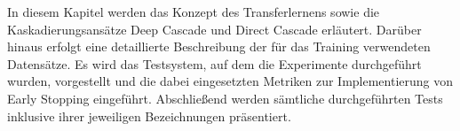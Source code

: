 In diesem Kapitel werden das Konzept des Transferlernens sowie die Kaskadierungsansätze Deep Cascade und Direct Cascade erläutert. 
Darüber hinaus erfolgt eine detaillierte Beschreibung der für das Training verwendeten Datensätze. Es wird das Testsystem, auf dem die 
Experimente durchgeführt wurden, vorgestellt und die dabei eingesetzten Metriken zur Implementierung von Early Stopping eingeführt. Abschließend 
werden sämtliche durchgeführten Tests inklusive ihrer jeweiligen Bezeichnungen präsentiert. 
